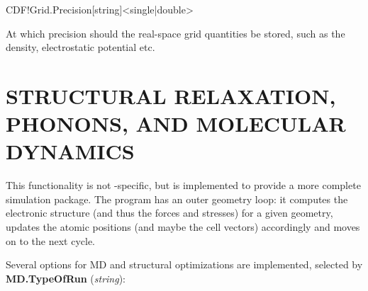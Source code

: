 \begin{fdfentry}{CDF!Grid.Precision}[string]<single|double>

  At which precision should the real-space grid quantities be stored,
  such as the density, electrostatic potential etc.
  
\end{fdfentry}



\vspace{5pt}
\section{STRUCTURAL RELAXATION, PHONONS, AND MOLECULAR DYNAMICS}

This functionality is not \siesta-specific, but is implemented to
provide a more complete simulation package. The program has an outer
geometry loop: it computes the electronic structure (and
thus the forces and stresses) for a given geometry, updates the
atomic positions (and maybe the cell vectors) accordingly and moves on
to the next cycle.

Several options for MD and structural optimizations are
implemented, selected by
\textbf{MD.TypeOfRun} (\textit{string}):

